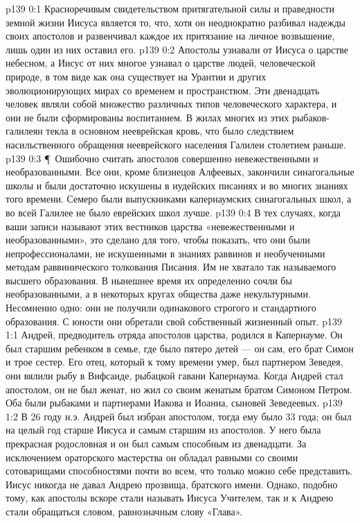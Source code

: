 \author{Комиссия срединников}
\vs p139 0:1 Красноречивым свидетельством притягательной силы и праведности земной жизни Иисуса является то, что, хотя он неоднократно разбивал надежды своих апостолов и развенчивал каждое их притязание на личное возвышение, лишь один из них оставил его.
\vs p139 0:2 Апостолы узнавали от Иисуса о царстве небесном, а Иисус от них многое узнавал о царстве людей, человеческой природе, в том виде как она существует на Урантии и других эволюционирующих мирах со временем и пространством. Эти двенадцать человек являли собой множество различных типов человеческого характера, и они не были сформированы  воспитанием. В жилах многих из этих рыбаков\hyp{}галилеян текла в основном нееврейская кровь, что было следствием насильственного обращения нееврейского населения Галилеи столетием раньше.
\vs p139 0:3 \P\ Ошибочно считать апостолов совершенно невежественными и необразованными. Все они, кроме близнецов Алфеевых, закончили синагогальные школы и были достаточно искушены в иудейских писаниях и во многих знаниях того времени. Семеро были выпускниками капернаумских синагогальных школ, а во всей Галилее не было еврейских школ лучше.
\vs p139 0:4 В тех случаях, когда ваши записи называют этих вестников царства «невежественными и необразованными», это сделано для того, чтобы показать, что они были непрофессионалами, не искушенными в знаниях раввинов и необученными методам раввинического толкования Писания. Им не хватало так называемого высшего образования. В нынешнее время их определенно сочли бы необразованными, а в некоторых кругах общества даже некультурными. Несомненно одно: они не получили одинакового строгого и стандартного образования. С юности они обретали свой собственный жизненный опыт.
\vs p139 1:1 Андрей, предводитель отряда апостолов царства, родился в Капернауме. Он был старшим ребенком в семье, где было пятеро детей --- он сам, его брат Симон и трое сестер. Его отец, который к тому времени умер, был партнером Зеведея, они вялили рыбу в Вифсаиде, рыбацкой гавани Капернаума. Когда Андрей стал апостолом, он не был женат, но жил со своим женатым братом Симоном Петром. Оба были рыбаками и партнерами Иакова и Иоанна, сыновей Зеведеевых.
\vs p139 1:2 В 26 году н.э. Андрей был избран апостолом, тогда ему было 33 года; он был на целый год старше Иисуса и самым старшим из апостолов. У него была прекрасная родословная и он был самым способным из двенадцати. За исключением ораторского мастерства он обладал равными со своими сотоварищами способностями почти во всем, что только можно себе представить. Иисус никогда не давал Андрею прозвища, братского имени. Однако, подобно тому, как апостолы вскоре стали называть Иисуса Учителем, так и к Андрею стали обращаться словом, равнозначным слову «Глава».
